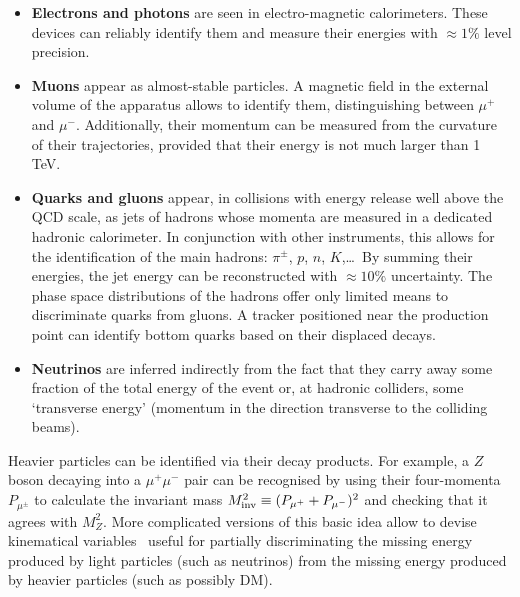 \begin{itemize}
\item[$\circ$] {\bf Electrons and photons} are seen in electro-magnetic calorimeters. These devices can reliably identify them and measure their
energies with $\approx 1\%$ level precision.

\item[$\circ$] {\bf Muons} appear as almost-stable particles. 
A magnetic field in the external volume of the apparatus allows to identify them, distinguishing between $\mu^+$ and $\mu^-$.
Additionally, their momentum can be measured
from the curvature of their trajectories, provided that their energy is not much larger than 1 TeV.

\item[$\circ$] {\bf Quarks and gluons} appear, in collisions with energy release well above the QCD scale, as jets of hadrons whose momenta
are measured in a dedicated hadronic calorimeter.
 In conjunction with other instruments, this allows for the identification of the main hadrons: $\pi^\pm$, $p$, $n$, $K$,\ldots~By summing their energies, the jet energy can be reconstructed with $\approx 10\%$ uncertainty.
The phase space distributions of the hadrons offer  only limited means to discriminate quarks from gluons.
 A tracker positioned near the production point can identify bottom quarks based on their displaced decays.


\item[$\circ$] {\bf Neutrinos} are inferred indirectly from the fact that they carry away some fraction of the total energy
of the event or, at hadronic colliders, some `transverse energy'
(momentum in the direction transverse to the colliding beams).


\end{itemize}
Heavier particles can be identified via their decay products. For example, a $Z$ boson decaying
into a $\mu^+\mu^-$ pair can be recognised by using their four-momenta $P_{\mu^\pm}$ to calculate the 
invariant mass $M_{\rm inv}^2\equiv(P_{\mu^+} + P_{\mu^-})^2$ and checking that it agrees with $M_Z^2$.
More complicated versions of this basic idea 
allow to devise kinematical variables~\cite{Barr:2003rg} useful for
partially discriminating the missing energy produced by
light particles (such as neutrinos) from the missing energy produced by heavier particles (such as possibly DM).





